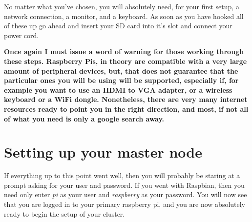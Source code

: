 \documentclass[]{article}
\begin{document}
                                                 No matter what you've chosen, you will absolutely need, for your first setup, a network connection, a 
                                                 monitor, and a keyboard. As soon as you have hooked all of these up go ahead and insert your SD card into 
                                                 it's slot and connect your power cord.

                                                 \textbf{Once again I must issue a word of warning for those working through these steps. Raspberry Pis, in 
                                                     theory are compatible with a very large amount of peripheral devices, but, that does not guarantee that the 
                                                         particular ones you will be using will be supported, especially if, for example you want to use an HDMI to 
                                                         VGA adapter, or a wireless keyboard or a WiFi dongle. Nonetheless, there are very many internet resources 
                                                         ready to point you in the right direction, and most, if not all of what you need is only a google search 
                                                         away.}

                                                         \section{Setting up your master node}
                                                         If everything up to this point went well, then you will probably be staring at a prompt asking for your user 
                                                         and password. If you went with Raspbian, then you need only enter \textit{pi} as your user and 
                                                         \textit{raspberry} as your password. You will now see that you are logged in to your primary raspberry pi, 
                                                         and you are now absolutely ready to begin the setup of your cluster.
\end{document}

